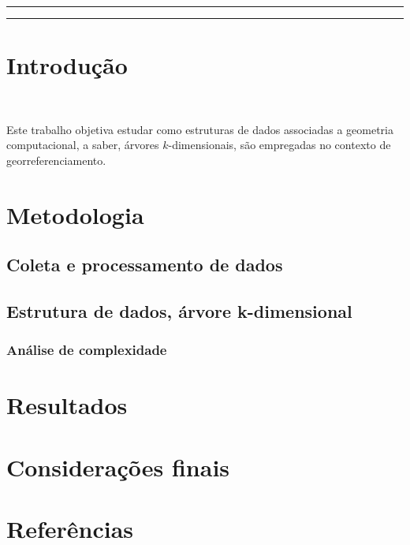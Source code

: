 \documentclass{article}
\begin{document}
\hrule
\vspace{.1cm}
\hrule
\begin{adjustwidth}{-1.5cm}{-1.5cm}

\section{Introdução}
\ 

Este trabalho objetiva estudar como estruturas de dados associadas a geometria computacional, a saber, árvores \(k\)-dimensionais, são empregadas no contexto de georreferenciamento.

\section{Metodologia}
\subsection{Coleta e processamento de dados}

\subsection{Estrutura de dados, árvore k-dimensional}

\subsubsection{Análise de complexidade}

\section{Resultados}

\section{Considerações finais}

\section{Referências}

\end{adjustwidth}
\end{document}

